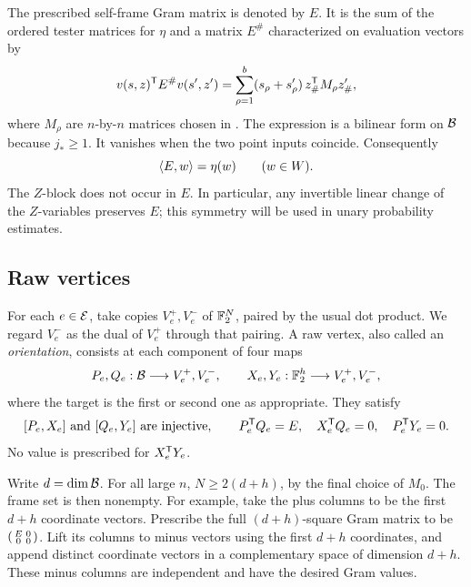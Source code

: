 The prescribed self-frame Gram matrix is denoted by \(E\).
It is the sum of the ordered tester matrices for \(\eta\) and a matrix \(E^\#\) characterized on evaluation vectors by
\begin{equation}\label{eq:E-sharp}
 v(s,z)^{\mathsf T} E^\#v(s',z')
   =\sum_{\rho=1}^b(s_\rho+s'_\rho)\,z_\#^{\mathsf T} M_\rho z'_\# ,
\end{equation}
where \(M_\rho\) are \(n\)-by-\(n\) matrices chosen in .
The expression is a bilinear form on \(\mathcal B\) because \(j_*\ge1\).
It vanishes when the two point inputs coincide.
Consequently
\begin{equation}\label{eq:E-moments}
 \langle E,w\rangle=\eta(w)\qquad(w\in W).
\end{equation}
The \(Z\)-block does not occur in \(E\).
In particular, any invertible linear change of the \(Z\)-variables preserves \(E\); this symmetry will be used in unary probability estimates.

\subsection{Raw vertices}

For each \(e\in\mathcal E\), take copies \(V_e^+,V_e^-\) of \(\mathbb F_2^N\), paired by the usual dot product.
We regard \(V_e^-\) as the dual of \(V_e^+\) through that pairing.
A raw vertex, also called an \emph{orientation}, consists at each component of four maps
\[
 P_e,Q_e:\mathcal B\longrightarrow V_e^+,V_e^-,
 \qquad X_e,Y_e:\mathbb F_2^h\longrightarrow V_e^+,V_e^-,
\]
where the target is the first or second one as appropriate.
They satisfy
\begin{equation}\label{eq:raw-frame-law}
 [P_e,X_e]\text{ and }[Q_e,Y_e]\text{ are injective},\qquad
 P_e^{\mathsf T} Q_e=E,\quad X_e^{\mathsf T} Q_e=0,\quad P_e^{\mathsf T} Y_e=0.
\end{equation}
No value is prescribed for \(X_e^{\mathsf T} Y_e\).

Write \(d=\dim\mathcal B\).
For all large \(n\), \(N\ge2(d+h)\), by the final choice of \(M_0\).
The frame set is then nonempty.
For example, take the plus columns to be the first \(d+h\) coordinate vectors.
Prescribe the full \((d+h)\)-square Gram matrix to be
\(\begin{psmallmatrix}E&0\\0&0\end{psmallmatrix}\).
Lift its columns to minus vectors using the first \(d+h\) coordinates, and append distinct coordinate vectors in a complementary space of dimension \(d+h\).
These minus columns are independent and have the desired Gram values.

